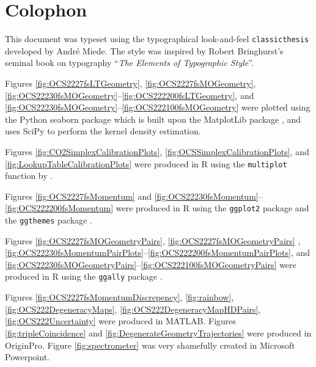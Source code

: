 \chapter{Colophon} \label{appx:colophon}

This document was typeset using the typographical look-and-feel \texttt{classicthesis} developed by Andr\'e Miede.
The style was inspired by Robert Bringhurst's seminal book on typography ``\emph{The Elements of Typographic Style}''.

Figures \ref{fig:OCS2227fsLTGeometry}, \ref{fig:OCS2227fsMOGeometry}, \ref{fig:OCS22230fsMOGeometry}--\ref{fig:OCS222200fsLTGeometry}, and \ref{fig:OCS22230fsMOGeometry}--\ref{fig:OCS222100fsMOGeometry} were plotted using the Python seaborn package \citep{Waskom17} which is built upon the MatplotLib package \citep{Hunter07}, and uses SciPy \citep{Oliphant07,Jones01}  to perform the kernel density estimation.

Figures \ref{fig:CO2SimplexCalibrationPlots}, \ref{fig:OCSSimplexCalibrationPlots}, and \ref{fig:LookupTableCalibrationPlots} were produced in R \citep{R17} using the \texttt{multiplot} function by \citet{Chang12}.

Figures \ref{fig:OCS2227fsMomentum} and \ref{fig:OCS22230fsMomentum}--\ref{fig:OCS222200fsMomentum} were produced in R using the \texttt{ggplot2} package \citep{Wickham09} and the \texttt{ggthemes} package \citep{Arnold17}.

Figures \ref{fig:OCS2227fsMOGeometryPairs}, \ref{fig:OCS2227fsMOGeometryPairs} , \ref{fig:OCS22230fsMomentumPairPlots}--\ref{fig:OCS222200fsMomentumPairPlots}, and \ref{fig:OCS22230fsMOGeometryPairs}--\ref{fig:OCS222100fsMOGeometryPairs} were produced in R using the \texttt{ggally} package \citep{Schloerke17,Emerson13}.

Figures \ref{fig:OCS2227fsMomentumDiscrepency}, \ref{fig:rainbow}, \ref{fig:OCS222DegeneracyMaps}, \ref{fig:OCS222DegeneracyMapHDPairs}, \ref{fig:OCS222Uncertainty} were produced in MATLAB. Figures \ref{fig:tripleCoincidence} and \ref{fig:DegenerateGeometryTrajectories} were produced in OriginPro. Figure \ref{fig:spectrometer} was very shamefully created in Microsoft Powerpoint.